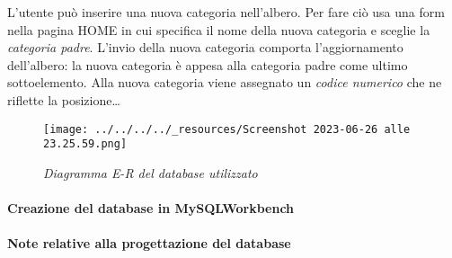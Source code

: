 L'utente può inserire una nuova categoria nell'albero. Per fare ciò usa
una form nella pagina HOME in cui specifica il nome della nuova
categoria e sceglie la \emph{categoria padre}. L'invio della nuova
categoria comporta l'aggiornamento dell'albero: la nuova categoria è
appesa alla categoria padre come ultimo sottoelemento. Alla nuova
categoria viene assegnato un \emph{codice numerico} che ne riflette la
posizione\ldots{}

\begin{figure}
\centering
\texttt{[image: ../../../../\_resources/Screenshot 2023-06-26 alle 23.25.59.png]}
\caption{\emph{Diagramma E-R del database utilizzato}}
\end{figure}

\pagebreak

\hypertarget{creazione-del-database-in-mysqlworkbench}{%
\paragraph{Creazione del database in
MySQLWorkbench}\label{creazione-del-database-in-mysqlworkbench}}

\begin{Shaded}
\begin{Highlighting}[]
  \NormalTok{ (}
 \NormalTok{,}
\NormalTok{(}\NormalTok{) } \NormalTok{,}
 \NormalTok{,}
   
\NormalTok{)}

  \NormalTok{ (}
\NormalTok{(}\NormalTok{) } \NormalTok{,}
   \NormalTok{(}\NormalTok{) } \NormalTok{,}
   
\NormalTok{) }
\end{Highlighting}
\end{Shaded}

\hypertarget{note-relative-alla-progettazione-del-database}{%
\paragraph{Note relative alla progettazione del
database}\label{note-relative-alla-progettazione-del-database}}

